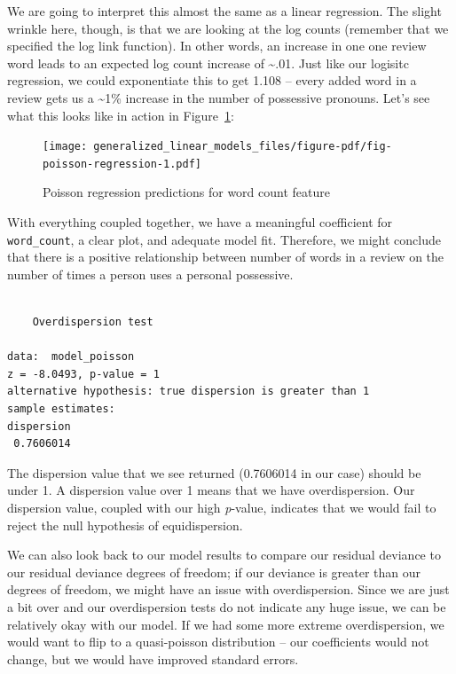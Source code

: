 \documentclass[
  letterpaper,
]{krantz}
\begin{document}
We are going to interpret this almost the same as a linear regression.
The slight wrinkle here, though, is that we are looking at the log
counts (remember that we specified the log link function). In other
words, an increase in one one review word leads to an expected log count
increase of \textasciitilde.01. Just like our logisitc regression, we
could exponentiate this to get 1.108 -- every added word in a review
gets us a \textasciitilde1\% increase in the number of possessive
pronouns. Let's see what this looks like in action in
Figure~\ref{fig-poisson-regression}:

\begin{figure}

{\centering \texttt{[image: generalized\_linear\_models\_files/figure-pdf/fig-poisson-regression-1.pdf]}

}

\caption{\label{fig-poisson-regression}Poisson regression predictions
for word count feature}

\end{figure}

With everything coupled together, we have a meaningful coefficient for
\texttt{word\_count}, a clear plot, and adequate model fit. Therefore,
we might conclude that there is a positive relationship between number
of words in a review on the number of times a person uses a personal
possessive.

\begin{verbatim}

    Overdispersion test

data:  model_poisson
z = -8.0493, p-value = 1
alternative hypothesis: true dispersion is greater than 1
sample estimates:
dispersion 
 0.7606014 
\end{verbatim}

The dispersion value that we see returned (0.7606014 in our case) should
be under 1. A dispersion value over 1 means that we have overdispersion.
Our dispersion value, coupled with our high \emph{p}-value, indicates
that we would fail to reject the null hypothesis of equidispersion.

We can also look back to our model results to compare our residual
deviance to our residual deviance degrees of freedom; if our deviance is
greater than our degrees of freedom, we might have an issue with
overdispersion. Since we are just a bit over and our overdispersion
tests do not indicate any huge issue, we can be relatively okay with our
model. If we had some more extreme overdispersion, we would want to flip
to a quasi-poisson distribution -- our coefficients would not change,
but we would have improved standard errors.
\end{document}
